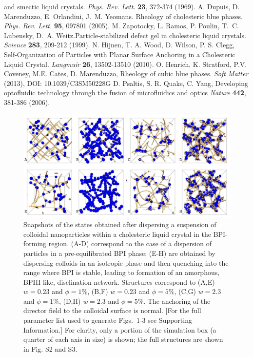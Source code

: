 \documentclass[12pt]{article}
\begin{document}
\begin{thebibliography}{99}
and smectic liquid crystals. {\it Phys. Rev. Lett.} {\bf 23}, 372-374 (1969).
 A. Dupuis, D. Marenduzzo, E. Orlandini, J.~M. Yeomans.
Rheology of cholesteric blue phases. {\it Phys. Rev. Lett.} {\bf 95},
097801 (2005).
 M. Zapotocky, L. Ramos, P. Poulin, T.~C. Lubensky, 
D.~A. Weitz.Particle-stabilized defect gel in cholesteric liquid crystals.  {\it Science} {\bf 283}, 209-212 (1999).
 N. Hijnen, T. A. Wood, D. Wilson, P. S. Clegg, 
Self-Organization of Particles with Planar Surface Anchoring in a Cholesteric
 Liquid Crystal. {\it Langmuir} {\bf 26}, 13502-13510 (2010).
 O. Henrich, K. Stratford, P.V. Coveney, M.E. Cates, D. Marenduzzo,
Rheology of cubic blue phases. {\it Soft Matter} (2013), DOI: 10.1039/C3SM50228G 
 D. Psaltis, S. R. Quake, C. Yang, Developing optofluidic technology through the fusion of microfluidics and optics {\it Nature} {\bf 442}, 381-386 (2006).
\end{thebibliography}

\newpage

\begin{figure}

\centerline{\includegraphics[width=\textwidth]{text-fig1.jpg}}
\caption{Snapshots of the states obtained after dispersing
a suspension of colloidal nanoparticles within a cholesteric liquid
crystal in the BPI-forming region. (A-D) correspond to the case
of a dispersion of particles in a pre-equilibrated BPI phase;
(E-H) are obtained by dispersing colloids in an isotropic
phase and then quenching into the range where BPI is stable, leading to formation of an amorphous, BPIII-like, disclination network.
Structures correspond
to (A,E) $w=0.23$ and $\phi=1\%$, 
(B,F) $w=0.23$ and $\phi=5\%$, 
(C,G) $w=2.3$ and $\phi=1\%$,
(D,H) $w=2.3$ and $\phi=5\%$.
The anchoring of the director field to the colloidal surface is normal.
[For the full parameter list used to generate Figs.~1-3 see Supporting Information.] For clarity, only a portion of the simulation box (a quarter of
each axis in size) is shown; the full structures are shown in Fig. S2 and S3.}
\end{figure}
\end{document}
